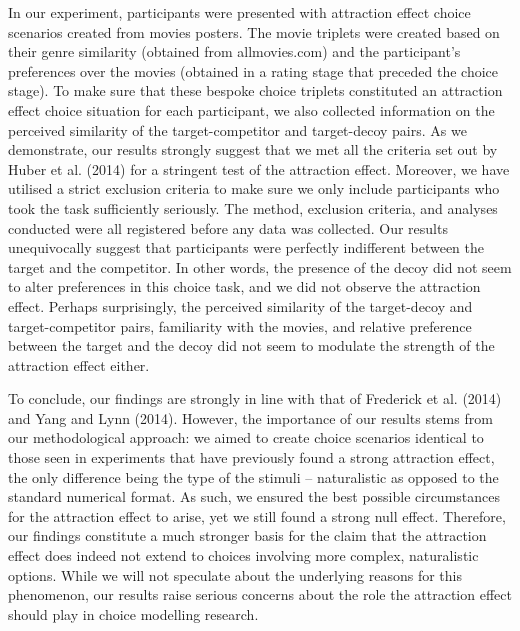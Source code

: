 \documentclass[12pt, a4paper]{article}
\begin{document}
In our experiment, participants were presented with attraction effect choice scenarios created from movies posters. The movie triplets were created based on their genre similarity (obtained from allmovies.com) and the participant’s preferences over the movies (obtained in a rating stage that preceded the choice stage). To make sure that these bespoke choice triplets constituted an attraction effect choice situation for each participant, we also collected information on the perceived similarity of the target-competitor and target-decoy pairs. As we demonstrate, our results strongly suggest that we met all the criteria set out by Huber et al. (2014) for a stringent test of the attraction effect. Moreover, we have utilised a strict exclusion criteria to make sure we only include participants who took the task sufficiently seriously. The method, exclusion criteria, and analyses conducted were all registered before any data was collected.
Our results unequivocally suggest that participants were perfectly indifferent between the target and the competitor. In other words, the presence of the decoy did not seem to alter preferences in this choice task, and we did not observe the attraction effect. Perhaps surprisingly, the perceived similarity of the target-decoy and target-competitor pairs, familiarity with the movies, and relative preference between the target and the decoy did not seem to modulate the strength of the attraction effect either.


To conclude, our findings are strongly in line with that of Frederick et al. (2014) and Yang and Lynn (2014). However, the importance of our results stems from our methodological approach: we aimed to create choice scenarios identical to those seen in experiments that have previously found a strong attraction effect, the only difference being the type of the stimuli – naturalistic as opposed to the standard numerical format. As such, we ensured the best possible circumstances for the attraction effect to arise, yet we still found a strong null effect. Therefore, our findings constitute a much stronger basis for the claim that the attraction effect does indeed not extend to choices involving more complex, naturalistic options. While we will not speculate about the underlying reasons for this phenomenon, our results raise serious concerns about the role the attraction effect should play in choice modelling research.
\end{document}
